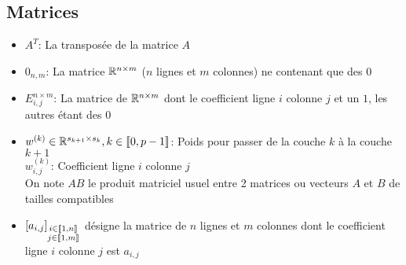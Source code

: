 \subsection{Matrices}
	\begin{itemize}
		\item $A^T$: La transposée de la matrice $A$\\
		\item $0_{n, m}$: La matrice $\mathbb{R}^{n\times m}$ ($n$ lignes et $m$ colonnes) ne contenant que des $0$\\
		\item $E^{n\times m}_{i,j}$: La matrice de $\mathbb{R}^{n\times m}$ dont le coefficient ligne $i$ colonne $j$ et un $1$, les autres étant des $0$\\
		
		\item $w^{(k)}\in\mathbb{R}^{s_{k+1}\times s_k}, k\in\left\llbracket0, p-1\right\rrbracket$: Poids pour passer de la couche $k$ à la couche $k+1$\\
					$w_{i, j}^{(k)}$: Coefficient ligne $i$ colonne $j$\\
					
					
					
					
					On note $AB$ le produit matriciel usuel entre 2 matrices ou vecteurs $A$ et $B$ de tailles compatibles\\
					
		
		\item $\left[a_{i, j}\right]_{\substack{i\in\left\llbracket1, n\right\rrbracket\\j\in\left\llbracket1, m\right\rrbracket}}$ désigne la matrice de $n$ lignes et $m$ colonnes dont le coefficient ligne $i$ colonne $j$ est $a_{i, j}$\\
	\end{itemize}
	
	
